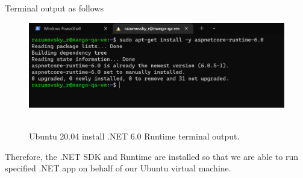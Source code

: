 Terminal output as follows
\begin{figure}[H]
    \centering
    \includegraphics[width=1\textwidth]{img/03_6_runtime_install}
    ~\caption{Ubuntu 20.04 install .NET 6.0 Runtime terminal output.}\label{fig:figure8}
\end{figure}
Therefore, the .NET SDK and Runtime are installed so that we are able to run specified .NET app on behalf of
our Ubuntu virtual machine.
